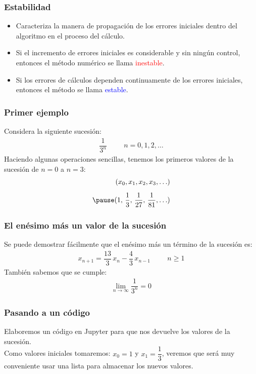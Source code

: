 \documentclass[12pt]{beamer}
\begin{document}
\begin{frame}
\frametitle{Estabilidad}
\begin{itemize}[<+->]
\item[\ding{221}] Caracteriza la manera de propagación de los errores iniciales dentro del algoritmo en el
proceso del cálculo.
\item[\ding{221}] Si el incremento de errores iniciales es considerable y sin ningún control, entonces el
método numérico se llama \textcolor{red}{inestable}.
\item[\ding{221}] Si los errores de cálculos dependen continuamente de los errores iniciales, entonces el método se llama \textcolor{blue}{estable}.
\end{itemize}
\end{frame}
\begin{frame}
\frametitle{Primer ejemplo}
Considera la siguiente sucesión:
\pause
\begin{align*}
\dfrac{1}{3^{n}} \hspace{1cm} n = 0, 1, 2, \ldots
\end{align*}
\pause
Haciendo algunas operaciones sencillas, tenemos los primeros valores de la sucesión de $n = 0$ a $n = 3$:
\pause
\begin{eqnarray*}
( x_{0}, x_{1}, x_{2}, x_{3}, \ldots ) \\[0.5em] \pause
( 1, \, \dfrac{1}{3}, \, \dfrac{1}{27}, \, \dfrac{1}{81}, \ldots )
\end{eqnarray*}
\end{frame}
\begin{frame}
\frametitle{El enésimo más un valor de la sucesión}
Se puede demostrar fácilmente que el enésimo más un término de la sucesión es:
\pause
\begin{align*}
x_{n+1} = \dfrac{13}{3} \, x_{n} - \dfrac{4}{3} \, x_{n-1} \hspace{1cm} n \geq 1
\end{align*}
\pause
También sabemos que se cumple:
\pause
\begin{align*}
\lim_{n \to \infty} \dfrac{1}{3^{n}} = 0
\end{align*}
\end{frame}
\begin{frame}
\frametitle{Pasando a un código}
Elaboremos un código en Jupyter para que nos devuelve los valores de la sucesión.
\\
\bigskip
\pause
Como valores iniciales tomaremos: $x_{0} = 1$ y $x_{1} = \dfrac{1}{3}$, veremos que será muy conveniente usar una lista para almacenar los nuevos valores.
\end{frame}
\end{document}
